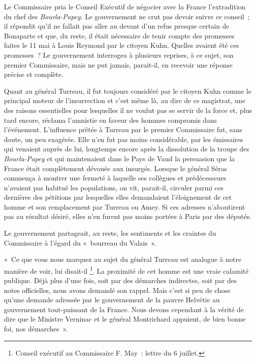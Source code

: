\documentclass[french,twoside]{book} %
\newenvironment{quoteblock}%
  {\begin{quoting}}
  {\end{quoting}}
\newenvironment{quotebar}{%
    \def\FrameCommand{{\color{rubric!10!}\vrule width 0.5em} \hspace{0.9em}}%
    \def\OuterFrameSep{\itemsep} %
    \MakeFramed {\advance\hsize-\width \FrameRestore}
  }%
  {%
    \endMakeFramed
  }
\renewenvironment{quoteblock}%
  {%
    \savenotes
    \setstretch{0.9}
    \normalfont
    \begin{quotebar}
  }
  {%
    \end{quotebar}
    \spewnotes
  }
\begin{document}
Le Commissaire pria le Conseil Exécutif de négocier avec la France l’extradition du chef des \emph{Bourla-Papey.} Le gouvernement ne crut pas devoir suivre ce conseil ; il répondit qu’il ne fallait pas aller au devant d’un refus presque certain de Bonaparte et que, du reste, il était nécessaire de tenir compte des promesses faites le 11 mai à Louis Reymond par le citoyen Kuhn. Quelles avaient été ces promesses ? Le gouvernement interrogea à plusieurs reprises, à ce sujet, son premier Commissaire, mais ne put jamais, parait-il, en recevoir une réponse précise et complète.\par
Quant au général Turreau, il fut toujours considéré par le citoyen Kuhn comme le principal moteur de l’insurrection et c’est même là, au dire de ce magistrat, une des raisons essentielles pour lesquelles il ne voulut pas se servir de la force et, plus tard encore, réclama l’amnistie en faveur des hommes compromis dans l’événement. L’influence prêtée à Turreau par le premier Commissaire fut, sans doute, un peu exagérée. Elle n’en fut pas moins considérable, par les émissaires qui venaient auprès de lui, longtemps encore après la dissolution de la troupe des \emph{Bourla-Papey} et qui maintenaient dans le Pays de Vaud la persuasion que la France était complètement dévouée aux insurgés. Lorsque le général Séras commença à montrer une fermeté à laquelle ses collègues et prédécesseurs n’avaient pas habitué les populations, on vit, parait-il, circuler parmi ces dernières des pétitions par lesquelles elles demandaient l’éloignement de cet homme et son remplacement par Turreau ou Amey. Si ces adresses n’aboutirent pas au résultat désiré, elles n’en furent pas moins portées à Paris par des députés.\par
Le gouvernement partageait, au reste, les sentiments et les craintes du Commissaire à l’égard du « bourreau du Valais ».\par

\begin{quoteblock}
 \noindent « Ce que vous nous marquez au sujet du général Turreau est analogue à notre manière de voir, lui disait-il \footnote{Conseil exécutif au Commissaire F. May : lettre du 6 juillet.}. La proximité de cet homme est une vraie calamité publique. Déjà plus d’une fois, soit par des démarches indirectes, soit par des notes officielles, nous avons demandé son rappel. Mais c’est si peu de chose qu’une demande adressée par le gouvernement de la pauvre Helvétie au gouvernement tout-puissant de la France. Nous devons cependant à la vérité de dire que le Ministre Verninac et le général Montrichard appuient, de bien bonne foi, nos démarches ».
 \end{quoteblock}
\end{document}

